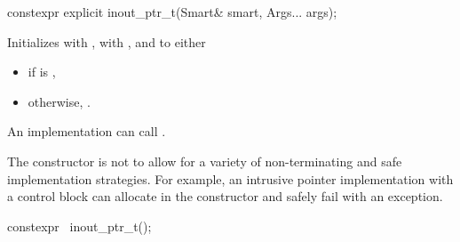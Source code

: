 %
\begin{itemdecl}
constexpr explicit inout_ptr_t(Smart& smart, Args... args);
\end{itemdecl}

\begin{itemdescr}
\pnum
\effects
Initializes  with ,
 with , and
 to either
\begin{itemize}
\item {} if  is ,
\item otherwise, .
\end{itemize}

\pnum
\remarks
An implementation can call .

\pnum
\begin{note}
The constructor is not 
to allow for a variety of non-terminating and safe implementation strategies.
For example, an intrusive pointer implementation with a control block
can allocate in the constructor and safely fail with an exception.
\end{note}
\end{itemdescr}

%
\begin{itemdecl}
constexpr ~inout_ptr_t();
\end{itemdecl}

